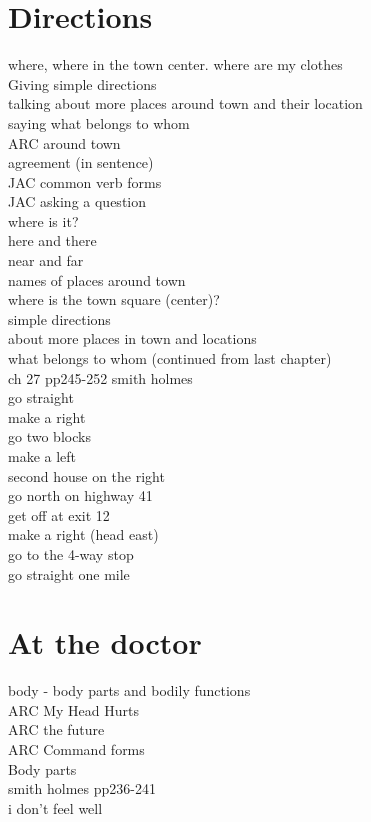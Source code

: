 \chapter{Directions}
where, where in the town center. where are my clothes\\
Giving simple directions\\
talking about more places around town and their location\\
saying what belongs to whom\\
ARC around town\\
agreement (in sentence)\\
JAC common verb forms\\
JAC asking a question\\
where is it?\\
here and there\\
near and far\\
names of places around town\\
where is the town square (center)?\\
simple directions\\
about more places in town and locations\\
what belongs to whom (continued from last chapter)\\
ch 27 pp245-252 smith holmes\\
go straight\\
make a right\\
go two blocks\\
make a left\\
second house on the right\\
go north on highway 41\\
get off at exit 12\\
make a right (head east)\\
go to the 4-way stop\\
go straight one mile\\
\chapter{At the doctor}
body - body parts and bodily functions\\
ARC My Head Hurts\\
ARC the future\\
ARC Command forms\\
Body parts\\
smith holmes pp236-241\\
i don't feel well\\
